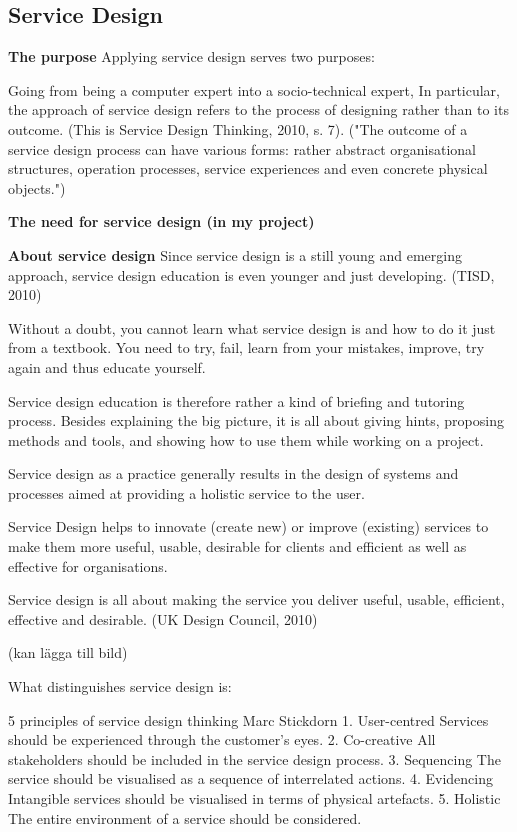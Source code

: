 \subsection{Service Design}

\textbf{The purpose}
Applying service design serves two purposes:

Going from being a computer expert into a socio-technical expert,
In particular, the approach of service design refers to the process of designing rather than to its outcome. (This is Service Design Thinking, 2010, s. 7). ("The outcome of a service design process can have various forms: rather abstract organisational structures, operation processes, service experiences and even concrete physical objects.")

\textbf{The need for service design (in my project)}

\textbf{About service design}
Since service design is a still young and emerging approach, service design education is even younger and just developing. (TISD, 2010)

Without a doubt, you cannot learn what service design is and how to do it just from a textbook. You need to try, fail, learn from your mistakes, improve, try again and thus educate yourself.

Service design education is therefore rather a kind of briefing and tutoring process. Besides explaining the big picture, it is all about giving hints, proposing methods and tools, and showing how to use them while working on a project.

Service design as a practice generally results in the design of systems and processes aimed at providing a holistic service to the user.

Service Design helps to innovate (create new) or improve (existing) services to make them more useful, usable, desirable for clients and efficient as well as effective for organisations.

Service design is all about making the service you deliver useful, usable, efficient, effective and desirable. (UK Design Council, 2010)

(kan lägga till bild)

What distinguishes service design is:

5 principles of service design thinking
Marc Stickdorn
1. User-centred
Services should be experienced through the customer’s eyes. 2. Co-creative
All stakeholders should be included in the service design process.
3. Sequencing
The service should be visualised as a sequence of interrelated actions.
4. Evidencing
Intangible services should be visualised in terms of physical artefacts.
5. Holistic
The entire environment of a service should be considered.

